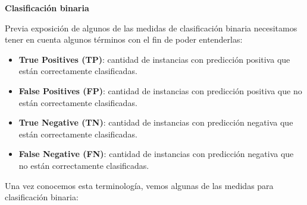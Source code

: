 \textbf{Clasificación binaria}

Previa exposición de algunos de las medidas de clasificación binaria necesitamos tener en cuenta algunos términos con el fin de poder entenderlas:
\begin{itemize}
	\item \textbf{True Positives (TP)}: cantidad de instancias con predicción positiva que están correctamente clasificadas.
	\item \textbf{False Positives (FP)}: cantidad de instancias con predicción positiva que no están correctamente clasificadas.
	\item \textbf{True Negative (TN)}: cantidad de instancias con predicción negativa que están correctamente clasificadas.
	\item \textbf{False Negative (FN)}: cantidad de instancias con predicción negativa que no están correctamente clasificadas.
\end{itemize}

Una vez conocemos esta terminología, vemos algunas de las medidas para clasificación binaria:

